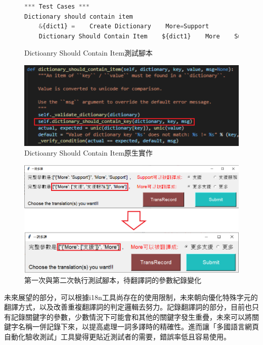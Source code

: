 \begin{figure}[H]
\centering
\begin{lstlisting}[language={python}]
*** Test Cases ***
Dictionary should contain item
    &{dict1} =    Create Dictionary    More=Support
    Dictionary Should Contain Item    ${dict1}    More    Support
\end{lstlisting}
\caption{Dictioanry Should Contain Item測試腳本}
\end{figure}

\begin{figure}[H]
\centering
\includegraphics[width= \textwidth]{../論文截圖/5-1-2 dictionary should contain item測試腳本與其原生實作.png}
\caption{Dictioanry Should Contain Item原生實作}
\end{figure}

\begin{figure}[H]
\centering
\includegraphics[width= \textwidth]{../論文截圖/5-1-3 1st&2nd執行測試腳本，待翻譯詞的參數紀錄變化.png}
\caption{第一次與第二次執行測試腳本，待翻譯詞的參數紀錄變化}
\end{figure}

未來展望的部分，可以根據i18n工具尚存在的使用限制，未來朝向優化特殊字元的翻譯方式，以及改善重複翻譯詞的判定邏輯去努力。記錄翻譯詞的部分，目前也只有記錄關鍵字的參數，少數情況下可能會和其他的關鍵字發生重疊，未來可以將關鍵字名稱一併記錄下來，以提高處理一詞多譯時的精確性。進而讓「多國語言網頁自動化驗收測試」工具變得更貼近測試者的需要，錯誤率低且容易使用。
